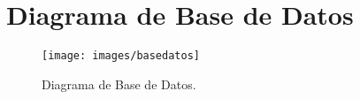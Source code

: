 \section{Diagrama de Base de Datos}

	\begin{figure}[htbp!]
		\centering
			\texttt{[image: images/basedatos]}
		\caption{Diagrama de Base de Datos.}
	\end{figure}